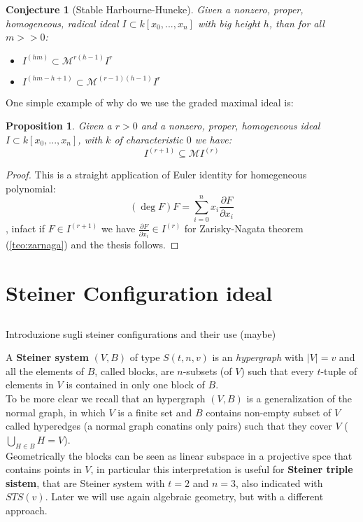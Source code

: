 \documentclass[]{book}
\theoremstyle{plain}
\newtheorem{prop}[teo]{Proposition}
\newtheorem{conj}[teo]{Conjecture}
\theoremstyle{remark}
\theoremstyle{definition}
\newcommand{\parder}[2]{ \frac{\partial #1}{\partial #2} }
\newcommand{\MM}{\mathcal{M}}
\begin{document}
	\begin{conj}[Stable Harbourne-Huneke]\label{conj:stabharbhun}
	Given a nonzero, proper, homogeneous, radical ideal $ I \subset k[x_0 , ... , x_n] $ with big height $ h $, than for all $ m >> 0 $:
	\begin{itemize}
	\item $ I^{(hm)} \subset \MM^{r(h-1)} I^r$
	\item $ I^{(hm - h +1 )} \subset \MM^{(r-1)(h-1)} I^r $
	\end{itemize}
	\end{conj}
	
	One simple example of why do we use the graded maximal ideal is:
	
	\begin{prop} \label{prop:eulid}
	Given a $ r>0 $ and a nonzero, proper, homogeneous ideal $ I \subset k[x_0 , ... , x_n] $, with $ k $ of characteristic $ 0 $ we have:
	\[ I^{(r+1)}   \subseteq \MM I^{(r)}\]
	\end{prop}
	\begin{proof}
	This is a straight application of Euler identity for homegeneous polynomial:
	\[ (\deg{F})F = \sum_{i=0}^{n} x_i \parder{F}{x_i} \]
	, infact if $ F \in I^{(r+1)} $ we have $ \parder{F}{x_i} \in I^{(r)} $ for Zarisky-Nagata theorem (\ref{teo:zarnaga}) and the thesis follows.
 	\end{proof}
 	
 	
 	
 	
	


\chapter{Steiner Configuration ideal}
\section*{}
\begin{tcolorbox}
Introduzione sugli steiner configurations and their use (maybe)
\end{tcolorbox}

A \textbf{Steiner system} $ (V,B) $ of type $ S(t,n,v) $ is an \textit{hypergraph} with $ |V|=v $ and all the elements of $ B $, called blocks, are $ n $-subsets (of $ V $) such that every $ t $-tuple of elements in $ V $ is contained in only one block of $ B $. \\
To be more clear we recall that an hypergraph $ (V,B) $ is a generalization of the normal graph, in which $ V $ is a finite set and $ B $ contains non-empty subset of $ V $ called hyperedges (a normal graph conatins only pairs) such that they cover $ V $ ($ \bigcup_{H \in B} H = V $).\\
Geometrically the blocks can be seen as linear subspace in a projective spce that contains points in $ V $, in particular this interpretation is useful for \textbf{Steiner triple sistem}, that are Steiner system with $ t=2 $ and $ n=3 $, also indicated with $ STS(v) $. Later we will use again algebraic geometry, but with a different approach.
\end{document}
